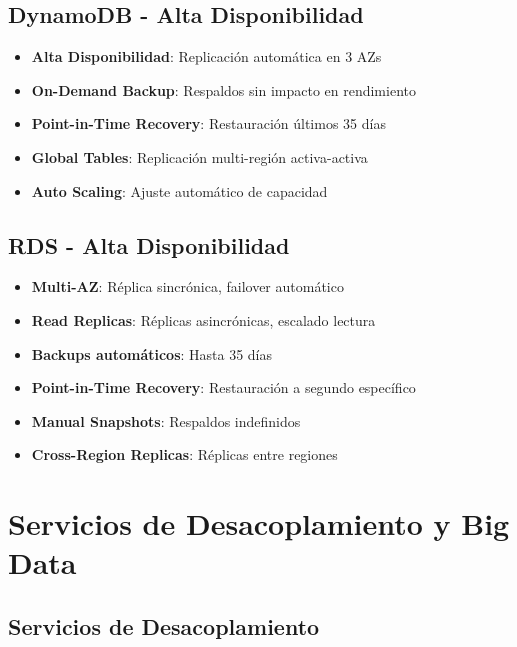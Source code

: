 \documentclass[12pt,a4paper]{report}
\begin{document}
\section{DynamoDB - Alta Disponibilidad}

\begin{awsbox}
\begin{itemize}
    \item \textbf{Alta Disponibilidad}: Replicación automática en 3 AZs
    \item \textbf{On-Demand Backup}: Respaldos sin impacto en rendimiento
    \item \textbf{Point-in-Time Recovery}: Restauración últimos 35 días
    \item \textbf{Global Tables}: Replicación multi-región activa-activa
    \item \textbf{Auto Scaling}: Ajuste automático de capacidad
\end{itemize}
\end{awsbox}

\section{RDS - Alta Disponibilidad}

\begin{conceptbox}[Características HA]
\begin{itemize}
    \item \textbf{Multi-AZ}: Réplica sincrónica, failover automático
    \item \textbf{Read Replicas}: Réplicas asincrónicas, escalado lectura
    \item \textbf{Backups automáticos}: Hasta 35 días
    \item \textbf{Point-in-Time Recovery}: Restauración a segundo específico
    \item \textbf{Manual Snapshots}: Respaldos indefinidos
    \item \textbf{Cross-Region Replicas}: Réplicas entre regiones
\end{itemize}
\end{conceptbox}

\newpage

\chapter{Servicios de Desacoplamiento y Big Data}

\section{Servicios de Desacoplamiento}
\end{document}
